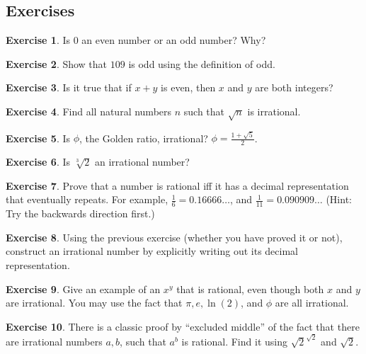 \documentclass[11pt]{article}
\theoremstyle{definition}
\newtheorem{exercise}{Exercise}
\numberwithin{thm}{section}
\begin{document}
\subsection{Exercises}

\begin{exercise} Is $0$ an even number or an odd number? Why?
\end{exercise}

\begin{exercise} Show that $109$ is odd using the definition of odd.
\end{exercise}

\begin{exercise} Is it true that if $x + y$ is even, then $x$ and $y$ are both integers?
\end{exercise}

\begin{exercise} Find all natural numbers $n$ such that $\sqrt{n}$ is irrational.
\end{exercise}

\begin{exercise} Is $\phi$, the Golden ratio, irrational? $\phi = \frac{1 + \sqrt{5}}{2}$.
\end{exercise}

\begin{exercise} Is $\sqrt[3]{2}$ an irrational number?
\end{exercise}

\begin{exercise} Prove that a number is rational iff it has a decimal representation that eventually repeats. For example, $\frac{1}{6} = 0.16666 \ldots$, and $\frac{1}{11} = 0.090909\ldots$ (Hint: Try the backwards direction first.)
\end{exercise}

\begin{exercise} Using the previous exercise (whether you have proved it or not), construct an irrational number by explicitly writing out its decimal representation.
\end{exercise}

\begin{exercise} Give an example of an $x^y$ that is rational, even though both $x$ and $y$ are irrational. You may use the fact that $\pi, e, \ln(2)$, and $\phi$ are all irrational.
\end{exercise}

\begin{exercise} There is a classic proof by ``excluded middle'' of the fact that there are irrational numbers $a,b$, such that $a^b$ is rational. Find it using $\sqrt{2}^{\sqrt{2}}$ and $\sqrt{2}$.
\end{exercise}
\end{document}

